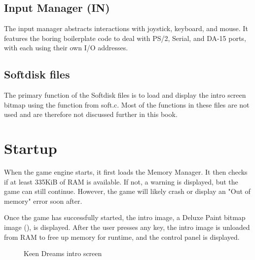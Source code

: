 \documentclass[book.tex]{subfiles}
\begin{document}
\subsection{Input Manager (IN)}
The input manager abstracts interactions with joystick, keyboard, and mouse. It features the boring boilerplate code to deal with PS/2, Serial, and DA-15 ports, with each using their own I/O addresses.

\subsection{Softdisk files}
The primary function of the Softdisk files is to load and display the intro screen bitmap using the  function from soft.c. Most of the functions in these files are not used and are therefore not discussed further in this book.
\pagebreak



\section{Startup}
When the game engine starts, it first loads the Memory Manager. It then checks if at least 335KiB of RAM is available. If not, a warning is displayed, but the game can still continue. However, the game will likely crash or display an "Out of memory" error soon after. \\

\par
Once the game has successfully started, the intro image, a Deluxe Paint bitmap image (), is displayed. After the user presses any key, the intro image is unloaded from RAM to free up memory for runtime, and the control panel is displayed.\\

\begin{figure}[H]
\centering
{}
\caption{Keen Dreams intro screen}
\end{figure}
\pagebreak
\end{document}
